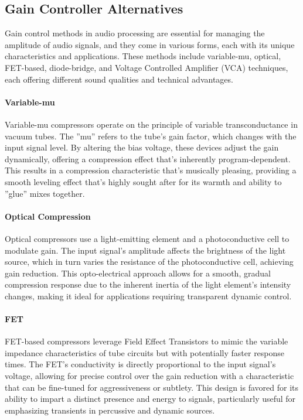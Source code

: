 \documentclass[10pt]{article}
\begin{document}
\begin{multicols*}{2}
            \subsection{Gain Controller Alternatives}\label{sect:vca}
                Gain control methods in audio processing are essential for managing the amplitude of audio signals, and they come in various forms, each with its unique characteristics and applications. These methods include variable-mu, optical, FET-based, diode-bridge, and Voltage Controlled Amplifier (VCA) techniques, each offering different sound qualities and technical advantages.

                \paragraph{Variable-mu}
                    Variable-mu compressors operate on the principle of variable transconductance in vacuum tubes. The ''mu'' refers to the tube's gain factor, which changes with the input signal level. By altering the bias voltage, these devices adjust the gain dynamically, offering a compression effect that's inherently program-dependent. This results in a compression characteristic that's musically pleasing, providing a smooth leveling effect that's highly sought after for its warmth and ability to ''glue'' mixes together.

                \paragraph{Optical Compression}
                    Optical compressors use a light-emitting element and a photoconductive cell to modulate gain. The input signal's amplitude affects the brightness of the light source, which in turn varies the resistance of the photoconductive cell, achieving gain reduction. This opto-electrical approach allows for a smooth, gradual compression response due to the inherent inertia of the light element's intensity changes, making it ideal for applications requiring transparent dynamic control.

                \paragraph{FET}
                    FET-based compressors leverage Field Effect Transistors to mimic the variable impedance characteristics of tube circuits but with potentially faster response times. The FET's conductivity is directly proportional to the input signal's voltage, allowing for precise control over the gain reduction with a characteristic that can be fine-tuned for aggressiveness or subtlety. This design is favored for its ability to impart a distinct presence and energy to signals, particularly useful for emphasizing transients in percussive and dynamic sources.
                

\end{multicols*}
\end{document}
